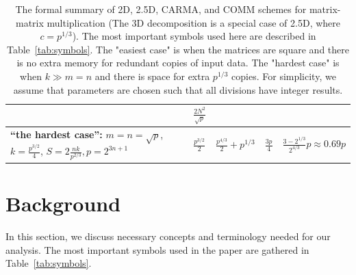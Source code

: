 \documentclass[sigplan,review,anonymous]{acmart}\settopmatter{printfolios=true,printccs=false,printacmref=false}
\newcommand\mac[1]{\textcolor{red}{[Mac: #1]}}
\begin{document}
\begin{table}
\begin{tabular}{lllll}
& 
$\frac{2N^2 }{\sqrt{p}}$
%
\vspace{1.0em}
%
\\
%
\midrule
%
\makecell[l]{\textbf{``the hardest case'':}\\
$m = n = \sqrt{p}$,\\
$k = \frac{p^{3/2}}{4}$,\\
$S = 2\frac{nk}{p^{2/3}}, p=2^{3n + 1}$}
&
$\frac{p^{3/2}}{2}$
&
$\frac{p^{4/3}}{2} + p^{1/3}$
&
$\frac{3p}{4}$
& 
$\frac{3-2^{1/3}}{2^{4/3}}p \approx 0.69 p$
%
\\
%
\bottomrule
%
\end{tabular}
%
\caption{The formal summary of 2D,
2.5D, CARMA, and COMM schemes for matrix-matrix multiplication (The 3D 
decomposition is a special case of 2.5D, where $c=p^{1/3}$).
The most important symbols used here are described in Table~\ref{tab:symbols}.
The "easiest case" is when the matrices are square and there is no extra
memory for redundant copies of input data. The "hardest case" is when $k \gg m
= n$ and there is space for extra $p^{1/3}$ copies.
For simplicity, we assume that parameters are chosen such that all divisions
have integer results.}
%
\label{tab:summary}
\end{table}
%

\section{Background}

In this section, we discuss necessary concepts and terminology needed for our 
analysis. The most important symbols used in the paper are gathered in 
Table~\ref{tab:symbols}.
\end{document}

